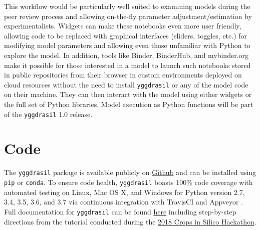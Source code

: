 \documentclass[journal]{IEEEtran}
\newcommand{\todo}[1]{{\color{red}{#1}}}
\newcommand{\pkg}{{\tt yggdrasil}{}}
\newcommand{\hrefgit}[1]{\href{https://github.com/cropsinsilico/yggdrasil}{{#1}}}
\newcommand{\hrefdoc}[1]{\href{https://cropsinsilico.github.io/yggdrasil/}{{#1}}}
\newcommand{\hrefhack}[1]{\href{https://cropsinsilico.github.io/yggdrasil/hackathon2018/index.html}{{#1}}}
\begin{document}
This workflow would be particularly well suited to examining models during the peer review process and allowing on-the-fly parameter adjustment/estimation by experimentalists. Widgets can make these notebooks even more user friendly, allowing code to be replaced with graphical interfaces (sliders, toggles, etc.) for modifying model parameters and allowing even those unfamiliar with Python to explore the model. In addition, tools like Binder, BinderHub, and mybinder.org \citep{Jupyter2018} make it possible for those interested in a model to launch such notebooks stored in public repositories from their browser in custom environments deployed on cloud resources without the need to install {\pkg} or any of the model code on their machine. They can then interact with the model using either widgets or the full set of Python libraries.
%
Model execution as Python functions will be part of the {\pkg} 1.0 release.

\section*{Code}\label{S:code}
The {\pkg} package is available publicly on \hrefgit{Github} and can be 
installed using {\tt pip} or {\tt conda}. To ensure code health, {\pkg} boasts 100\% code coverage with automated testing on Linux, Mac OS X, and Windows for Python version 2.7, 3.4, 3.5, 3.6, and 3.7 via continuous integration with TravisCI \citep{travisci} and Appveyor \citep{appveyor}. Full documentation for {\pkg} can be found \hrefdoc{here} including step-by-step directions from the tutorial conducted during the \hrefhack{2018 Crops in Silico Hackathon}. 


\end{document}
